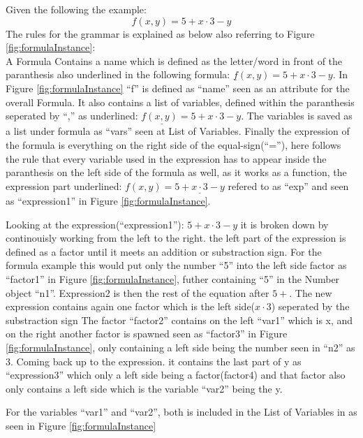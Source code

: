 Given the following the example: $$f(x, y) = 5 + x \cdot 3 - y$$
The rules for the grammar is explained as below also referring to
Figure \ref{fig:formulaInstance}:
\\
A Formula Contains a name which is defined as the letter/word in front of the paranthesis
also underlined in the following formula: $\underline{f}(x, y) = 5 + x \cdot 3 - y$.
In Figure \ref{fig:formulaInstance} ``f'' is defined as ``name'' seen as an attribute
for the overall Formula.
It also contains a list of variables, defined within the paranthesis seperated
by ``,'' as underlined: $f\underline{(x, y)} = 5 + x \cdot 3 - y$. The variables is saved
as a list under formula as ``vars'' seen at List of Variables.
Finally the expression of the formula is everything on the right side of the equal-sign(``=''),
here follows the rule that every variable used in the expression has to appear inside
the paranthesis on the left side of the formula as well, as it works as a function,
the expression part underlined: $f(x, y) = \underline{5 + x \cdot 3 - y}$ refered to
as ``exp'' and seen as ``expression1'' in Figure \ref{fig:formulaInstance}. 

Looking at the expression(``expression1''): $5 + x \cdot 3 - y$ it is broken down by continouisly
working from the left to the right. the left part of the expression is defined as a factor until
it meets an addition or substraction sign. For the formula example this would put only the number
``5'' into the left side factor as ``factor1'' in Figure \ref{fig:formulaInstance},
futher containing ``5'' in the Number object ``n1''.
Expression2 is then the rest of the equation after $5 +$. The new expression
contains again one factor which is the left side($x \cdot 3$) seperated by the substraction sign
The factor ``factor2'' contains on the left ``var1'' which is x, and on the right another factor
is spawned seen as ``factor3'' in Figure \ref{fig:formulaInstance}, only containing a left
side being the number seen in ``n2'' as 3.
Coming back up to the expression. it contains the last part of y as ``expression3''
which only a left side being a factor(factor4) and that factor also only contains a left side
which is the variable ``var2'' being the y.

For the variables ``var1'' and ``var2'', both is included in the List of Variables in as seen in
Figure \ref{fig:formulaInstance}



